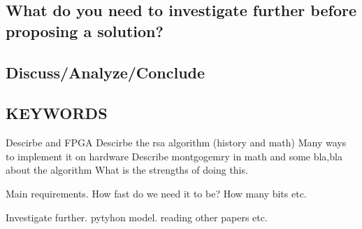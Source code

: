 \subsection{What do you need to investigate further before proposing a solution?}
\subsection{Discuss/Analyze/Conclude}


\subsection{KEYWORDS}
Descirbe and FPGA
Descirbe the rsa algorithm (history and math)
Many ways to implement it on hardware
Describe montgogemry in math and some bla,bla about the algorithm
What is the strengths of doing this.

Main requirements. How fast do we need it to be? How many bits etc.

Investigate further. pytyhon model. reading other papers etc.
